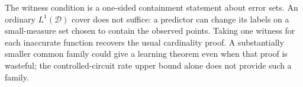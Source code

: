 The witness condition is a one-sided containment statement about error
sets. An ordinary $L^1(\mathcal D)$ cover does not suffice: a predictor
can change its labels on a small-measure set chosen to contain the
observed points. Taking one witness for each inaccurate function
recovers the usual cardinality proof. A substantially smaller common
family could give a learning theorem even when that proof is wasteful;
the controlled-circuit rate upper bound alone does not provide such
a family.
